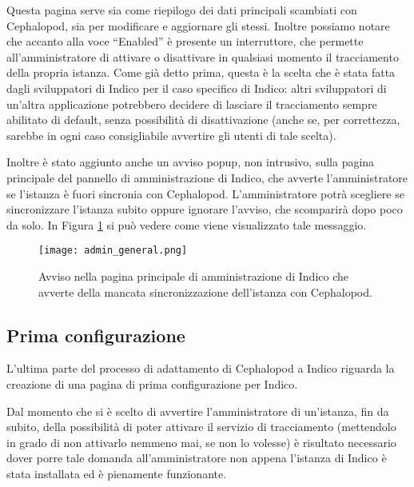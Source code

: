    	Questa pagina serve sia come riepilogo dei dati principali scambiati con Cephalopod, sia per modificare e aggiornare gli stessi. Inoltre possiamo notare che accanto alla voce ``Enabled'' è presente un interruttore, che permette all'amministratore di attivare o disattivare in qualsiasi momento il tracciamento della propria istanza. Come già detto prima, questa è la scelta che è stata fatta dagli sviluppatori di Indico per il caso specifico di Indico: altri sviluppatori di un'altra applicazione potrebbero decidere di lasciare il tracciamento sempre abilitato di default, senza possibilità di disattivazione (anche se, per correttezza, sarebbe in ogni caso consigliabile avvertire gli utenti di tale scelta).
    	
    	Inoltre è stato aggiunto anche un avviso popup, non intrusivo, sulla pagina principale del pannello di amministrazione di Indico, che avverte l'amministratore se l'istanza è fuori sincronia con Cephalopod. L'amministratore potrà scegliere se sincronizzare l'istanza subito oppure ignorare l'avviso, che scomparirà dopo poco da solo. In Figura \ref{fig:admin_general} si può vedere come viene visualizzato tale messaggio.
    	
    	\begin{figure}[h!]
    		\begin{center}
    			\texttt{[image: admin\_general.png]}
    		\end{center}
    		\caption[Avviso della mancata sincronia con Cephalopod]{Avviso nella pagina principale di amministrazione di Indico che avverte della mancata sincronizzazione dell'istanza con Cephalopod.}
    		\label{fig:admin_general}
    	\end{figure}
    
        \subsection{Prima configurazione} \label{subsec:it;ai;prima_configurazione}
        
            L'ultima parte del processo di adattamento di Cephalopod a Indico riguarda la creazione di una pagina di prima configurazione per Indico.
            
            Dal momento che si è scelto di avvertire l'amministratore di un'istanza, fin da subito, della possibilità di poter attivare il servizio di tracciamento (mettendolo in grado di non attivarlo nemmeno mai, se non lo volesse) è risultato necessario dover porre tale domanda all'amministratore non appena l'istanza di Indico è stata installata ed è pienamente funzionante.
            
